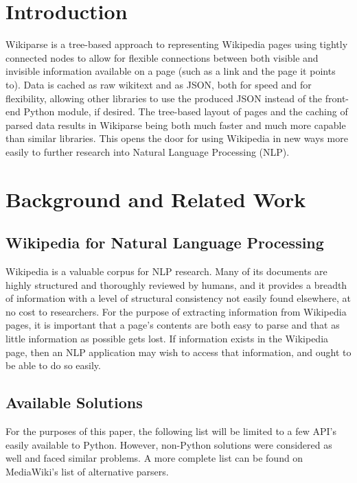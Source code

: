 \section{Introduction}

Wikiparse is a tree-based approach to representing Wikipedia pages using tightly connected nodes to allow for flexible connections between both visible and invisible information available on a page (such as a link and the page it points to). Data is cached as raw wikitext and as JSON, both for speed and for flexibility, allowing other libraries to use the produced JSON instead of the front-end Python module, if desired. The tree-based layout of pages and the caching of parsed data results in Wikiparse being both much faster and much more capable than similar libraries. This opens the door for using Wikipedia in new ways more easily to further research into Natural Language Processing (NLP).


\section{Background and Related Work}


\subsection{Wikipedia for Natural Language Processing}

Wikipedia is a valuable corpus for NLP research. Many of its documents are highly structured and thoroughly reviewed by humans, and it provides a breadth of information with a level of structural consistency not easily found elsewhere, at no cost to researchers. For the purpose of extracting information from Wikipedia pages, it is important that a page's contents are both easy to parse and that as little information as possible gets lost. If information exists in the Wikipedia page, then an NLP application may wish to access that information, and ought to be able to do so easily.

\subsection{Available Solutions}

For the purposes of this paper, the following list will be limited to a few API's easily available to Python. However, non-Python solutions were considered as well and faced similar problems. A more complete list can be found on MediaWiki's list of alternative parsers\cite{altparsers}.

